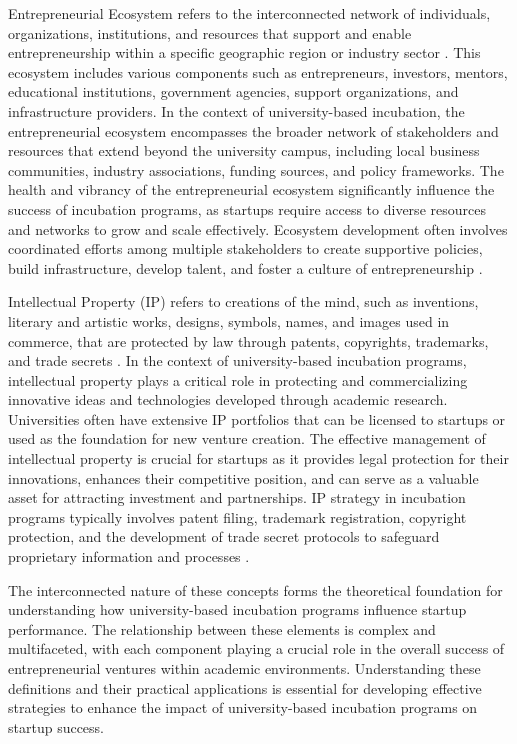\documentclass[../Main.tex]{subfiles}
\begin{document}
Entrepreneurial Ecosystem refers to the interconnected network of individuals, organizations, institutions, and resources that support and enable entrepreneurship within a specific geographic region or industry sector \cite{spigel2017relational, stam2015entrepreneurial}. This ecosystem includes various components such as entrepreneurs, investors, mentors, educational institutions, government agencies, support organizations, and infrastructure providers. In the context of university-based incubation, the entrepreneurial ecosystem encompasses the broader network of stakeholders and resources that extend beyond the university campus, including local business communities, industry associations, funding sources, and policy frameworks. The health and vibrancy of the entrepreneurial ecosystem significantly influence the success of incubation programs, as startups require access to diverse resources and networks to grow and scale effectively. Ecosystem development often involves coordinated efforts among multiple stakeholders to create supportive policies, build infrastructure, develop talent, and foster a culture of entrepreneurship \cite{isenberg2011introducing}.

Intellectual Property (IP) refers to creations of the mind, such as inventions, literary and artistic works, designs, symbols, names, and images used in commerce, that are protected by law through patents, copyrights, trademarks, and trade secrets \cite{wipo2020intellectual}. In the context of university-based incubation programs, intellectual property plays a critical role in protecting and commercializing innovative ideas and technologies developed through academic research. Universities often have extensive IP portfolios that can be licensed to startups or used as the foundation for new venture creation. The effective management of intellectual property is crucial for startups as it provides legal protection for their innovations, enhances their competitive position, and can serve as a valuable asset for attracting investment and partnerships. IP strategy in incubation programs typically involves patent filing, trademark registration, copyright protection, and the development of trade secret protocols to safeguard proprietary information and processes \cite{grimaldi2005university, phan2005university}.

The interconnected nature of these concepts forms the theoretical foundation for understanding how university-based incubation programs influence startup performance. The relationship between these elements is complex and multifaceted, with each component playing a crucial role in the overall success of entrepreneurial ventures within academic environments. Understanding these definitions and their practical applications is essential for developing effective strategies to enhance the impact of university-based incubation programs on startup success.
\end{document}
